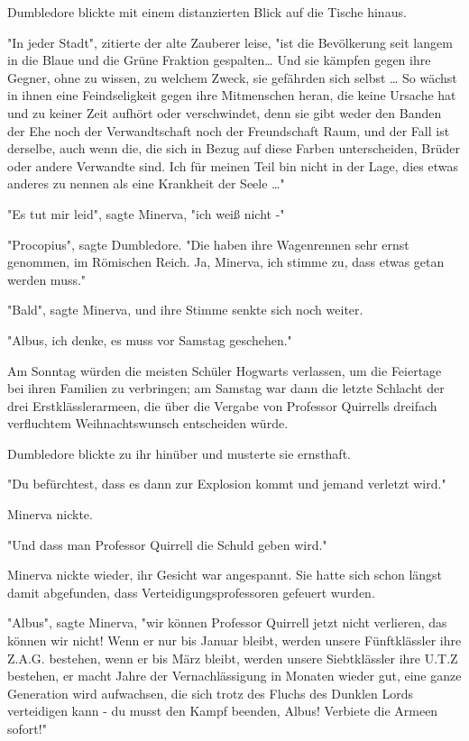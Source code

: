{Dumbledore blickte mit einem distanzierten Blick auf die Tische hinaus.

"In jeder Stadt", zitierte der alte Zauberer leise, "ist die Bevölkerung seit langem in die Blaue und die Grüne Fraktion gespalten… Und sie kämpfen gegen ihre Gegner, ohne zu wissen, zu welchem Zweck, sie gefährden sich selbst … So wächst in ihnen eine Feindseligkeit gegen ihre Mitmenschen heran, die keine Ursache hat und zu keiner Zeit aufhört oder verschwindet, denn sie gibt weder den Banden der Ehe noch der Verwandtschaft noch der Freundschaft Raum, und der Fall ist derselbe, auch wenn die, die sich in Bezug auf diese Farben unterscheiden, Brüder oder andere Verwandte sind. Ich für meinen Teil bin nicht in der Lage, dies etwas anderes zu nennen als eine Krankheit der Seele …"

"Es tut mir leid", sagte Minerva, "ich weiß nicht -"

"Procopius", sagte Dumbledore. "Die haben ihre Wagenrennen sehr ernst genommen, im Römischen Reich. Ja, Minerva, ich stimme zu, dass etwas getan werden muss."

"Bald", sagte Minerva, und ihre Stimme senkte sich noch weiter.

"Albus, ich denke, es muss vor Samstag geschehen."

Am Sonntag würden die meisten Schüler Hogwarts verlassen, um die Feiertage bei ihren Familien zu verbringen; am Samstag war dann die letzte Schlacht der drei Erstklässlerarmeen, die über die Vergabe von Professor Quirrells dreifach verfluchtem Weihnachtswunsch entscheiden würde.

Dumbledore blickte zu ihr hinüber und musterte sie ernsthaft.

"Du befürchtest, dass es dann zur Explosion kommt und jemand verletzt wird."

Minerva nickte.

"Und dass man Professor Quirrell die Schuld geben wird."

Minerva nickte wieder, ihr Gesicht war angespannt. Sie hatte sich schon längst damit abgefunden, dass Verteidigungsprofessoren gefeuert wurden.

"Albus", sagte Minerva, "wir können Professor Quirrell jetzt nicht verlieren, das können wir nicht! Wenn er nur bis Januar bleibt, werden unsere Fünftklässler ihre Z.A.G. bestehen, wenn er bis März bleibt, werden unsere Siebtklässler ihre U.T.Z bestehen, er macht Jahre der Vernachlässigung in Monaten wieder gut, eine ganze Generation wird aufwachsen, die sich trotz des Fluchs des Dunklen Lords verteidigen kann - du musst den Kampf beenden, Albus! Verbiete die Armeen sofort!"

}
